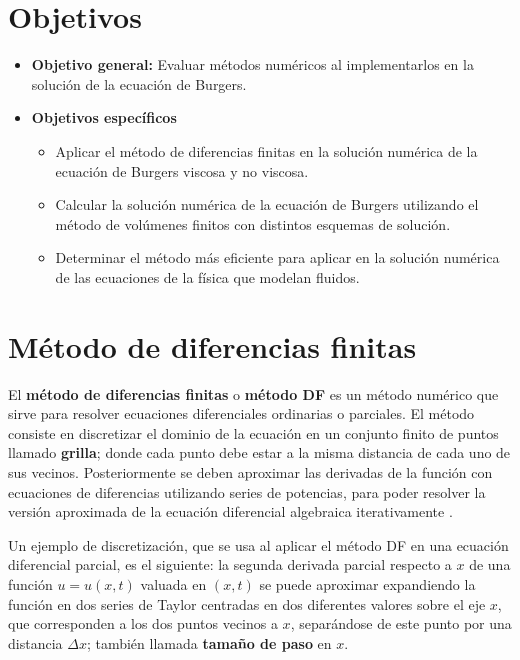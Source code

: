 \documentclass[12pt]{article}
\begin{document}
	\newpage
	\section{Objetivos}
	\begin{itemize}
		\item \textbf{Objetivo general:} Evaluar métodos numéricos al implementarlos en la solución de la ecuación de Burgers.
		\item  \textbf{Objetivos específicos}
		\begin{itemize}
			\item Aplicar el método de diferencias finitas en la solución numérica de la ecuación de Burgers viscosa y no viscosa.
			\item Calcular la solución numérica de la ecuación de Burgers utilizando el método de volúmenes finitos con distintos esquemas de solución.
			\item Determinar el método más eficiente para aplicar en la solución numérica de las ecuaciones de la física que modelan fluidos.
		\end{itemize}
	\end{itemize}
	\clearpage
	
	\section{Método de diferencias finitas}
	El \textbf{método de diferencias finitas} o \textbf{método DF} es un método numérico que sirve para resolver ecuaciones diferenciales ordinarias o parciales. El método consiste en discretizar el dominio de la ecuación en un conjunto finito de puntos llamado \textbf{grilla}; donde cada punto debe estar a la misma distancia de cada uno de sus vecinos. Posteriormente se deben aproximar las derivadas de la función con ecuaciones de diferencias utilizando series de potencias, para poder resolver la versión aproximada de la ecuación diferencial algebraica iterativamente \cite{devries2011first}.
	
	Un ejemplo de discretización, que se usa al aplicar el método DF en una ecuación diferencial parcial, es el siguiente: la segunda derivada parcial respecto a $x$ de una función $u = u(x,t)$ valuada en $(x,t)$ se puede aproximar expandiendo la función en dos series de Taylor centradas en dos diferentes valores sobre el eje $x$, que corresponden a los dos puntos vecinos a $x$, separándose de este punto por una distancia $\Delta x$; también llamada \textbf{tamaño de paso} en $x$. 
	
\end{document}

